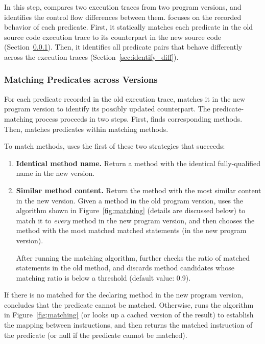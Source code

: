 

In this step, \ourtool compares two execution traces
from two program versions, and identifies the
control flow differences between them. \ourtool focuses on the
recorded behavior of each predicate.
First, it statically
matches each predicate in the old
source code execution trace to its counterpart in the new source code
(Section~\ref{sec:match_predicate}).
Then, it identifies all predicate pairs that
behave differently across the execution traces (Section~\ref{sec:identify_diff}).


\subsubsection{Matching Predicates across Versions}
\label{sec:match_predicate}

For each predicate recorded in the old execution trace,
\ourtool matches it in the new program version to identify
its possibly updated counterpart.
The predicate-matching process proceeds in two steps.
First, \ourtool finds corresponding methods.
Then, \ourtool matches predicates within matching methods.

To match methods, \ourtool uses
the first of these two strategies that succeeds:


\vspace{-1mm}

\begin{enumerate}
\item \textbf{Identical method name.} Return a method with the identical
fully-qualified name in the new version.
\item \textbf{Similar method content.} Return the method with
the most similar content in the new version. Given
a method in the old program version, \ourtool
uses the algorithm shown in Figure~\ref{fig:matching}
(details are discussed below) to match it
to \textit{every} method in the new program version, and then
chooses the method with the most matched matched statements
(in the new program version).

After running the matching algorithm, \ourtool further checks the ratio of
matched statements in the old method, and discards method candidates whose
matching ratio is below a threshold (default value: 0.9).
\end{enumerate}


If there is no matched for the declaring method in the new program
version, \ourtool concludes that the predicate cannot be
matched. Otherwise, \ourtool runs the algorithm
in Figure~\ref{fig:matching} (or looks up a cached version of the result)
to establish the mapping between
instructions, and then returns the matched instruction of the
predicate (or null if the predicate cannot be matched).


